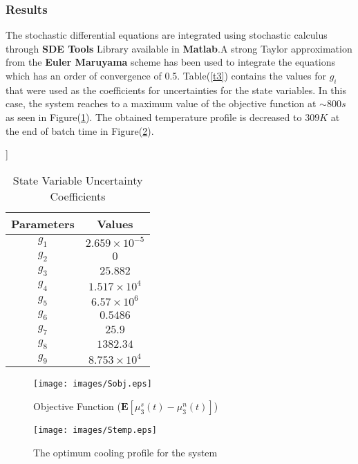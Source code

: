 \documentclass[3p,times]{elsarticle}
\begin{document}
\subsubsection{Results}
The stochastic differential equations are integrated using stochastic calculus through \textbf{SDE Tools} Library available in \textbf{Matlab}.A strong Taylor approximation from the \textbf{Euler Maruyama} scheme has been used to integrate the equations which has an order of convergence of 0.5. Table(\ref{t3}) contains the values for $g_{i}$ that were used as the coefficients for uncertainties for the state variables. In this case, the system reaches to a maximum value of the objective function at $\sim 800 s$ as seen in Figure(\ref{Sobj}). The obtained temperature profile is decreased to $309 K$ at the end of batch time in Figure(\ref{Stemp}). 
\begin{center}
\begin{table}[!h] ]
\centering
\caption{State Variable Uncertainty Coefficients\cite{yenkie}} \label{t3}
\begin{tabular}{|c|c|}
\hline
Parameters & Values \\
\hline
$g_{1}$ & $2.659\times10^{-5}$ \\
$g_{2}$ & $0$ \\
$g_{3}$ & $25.882$ \\
$g_{4}$ & $1.517\times10^{4}$ \\ 
$g_{5}$ & $6.57\times10^{6}$ \\
$g_{6}$ & $0.5486$ \\
$g_{7}$ & $25.9$\\
$g_{8}$ & $1382.34$ \\
$g_{9}$ & $8.753\times10^{4}$ \\
\hline
\end{tabular}

\label{Table2}
\end{table}
\end{center}

\begin{figure}[h!]

\begin{center}
\texttt{[image: images/Sobj.eps]}
\end{center}
\caption{Objective Function ($\mathbf{E}\left[\mu_{3}^{s}(t) - \mu_{3}^{n}(t)\right]$)} \label{Sobj}
\end{figure}
\begin{figure}[h!] 

\begin{center}
\texttt{[image: images/Stemp.eps]}
\end{center}
\caption{The optimum cooling profile for the system} \label{Stemp}
\end{figure}
\end{document}
